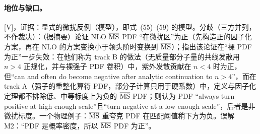 \paragraph{地位与缺口。}[V]，证据：显式的微扰反例（模型），即\cite{CollinsRogersSato2022}式~(55)--(59) 的模型。分歧（三方并列，不作裁决）：\cite{CandidoForteHekhorn2020}（据摘要）论证 NLO $\overline{\mathrm{MS}}$ PDF “在微扰区”为正（先构造正的因子化方案，再在 NLO 的方案变换小于领头阶时变换到 $\overline{\mathrm{MS}}$）；\cite{CollinsRogersSato2022}指出该论证在“裸 PDF 为正”一步失效：在他们称为 track B 的做法（无质量部分子量的共线发散用 $n>4$ 正规化，并与裸强子 PDF 卷积）中，紫外发散贡献在 $n<4$ 时为正，但“can and often do become negative after analytic continuation to $n>4$”，而在 track A（强子的重整化算符 PDF，部分子计算只用于硬系数）中，定义与因子化定理都不排除低、中等标度上为负的 $\overline{\mathrm{MS}}$ PDF；\cite[第~3--4~节]{Candido:2023ujx}则认为 PDF “always turn positive at high enough scale”且“turn negative at a low enough scale”，后者是非微扰标度。一个物理例子：$\overline{\mathrm{MS}}$ 重夸克 PDF 在匹配阈值稍下方为负\cite[第~I~节]{CollinsRogersSato2022}。误解 M2：“PDF 是概率密度，所以 $\overline{\mathrm{MS}}$ PDF 为正”。

